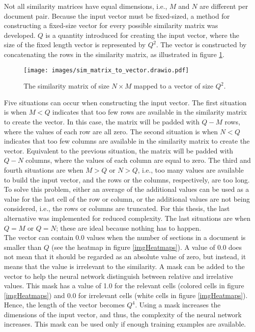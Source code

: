 Not all similarity matrices have equal dimensions, i.e., $M$ and $N$ are different per document pair. Because the input vector must be fixed-sized, a method for constructing a fixed-size vector for every possible similarity matrix was developed. $Q$ is a quantity introduced for creating the input vector, where the size of the fixed length vector is represented by $Q^2$. The vector is constructed by concatenating the rows in the similarity matrix, as illustrated in figure \ref{imgMatrixToVector}.


\begin{figure}[h]
\centering
\captionsetup{justification=centering}
\texttt{[image: images/sim\_matrix\_to\_vector.drawio.pdf]}
\caption{The similarity matrix of size $N \times M$ mapped to a vector of size $Q^2$.}
\label{imgMatrixToVector}
\end{figure}


Five situations can occur when constructing the input vector. The first situation is when $M < Q$ indicates that too few rows are available in the similarity matrix to create the vector. In this case, the matrix will be padded with $Q - M$ rows, where the values of each row are all zero. The second situation is when $N < Q$ indicates that too few columns are available in the similarity matrix to create the vector. Equivalent to the previous situation, the matrix will be padded with $Q - N$ columns, where the values of each column are equal to zero. The third and fourth situations are when $M > Q$ or $N > Q$, i.e., too many values are available to build the input vector, and the rows or the columns, respectively, are too long. To solve this problem, either an average of the additional values can be used as a value for the last cell of the row or column, or the additional values are not being considered, i.e., the rows or columns are truncated. For this thesis, the last alternative was implemented for reduced complexity. The last situations are when $Q = M$ or $Q = N$; these are ideal because nothing has to happen.\\


The vector can contain 0.0 values when the number of sections in a document is smaller than $Q$ (see the heatmap in figure \ref{imgHeatmaps}). A value of 0.0 does not mean that it should be regarded as an absolute value of zero, but instead, it means that the value is irrelevant to the similarity. A mask can be added to the vector to help the neural network distinguish between relative and irrelative values. This mask has a value of 1.0 for the relevant cells (colored cells in figure \ref{imgHeatmaps}) and 0.0 for irrelevant cells (white cells in figure \ref{imgHeatmaps}). Hence, the length of the vector becomes $Q^4$. Using a mask increases the dimensions of the input vector, and thus, the complexity of the neural network increases. This mask can be used only if enough training examples are available.\\

